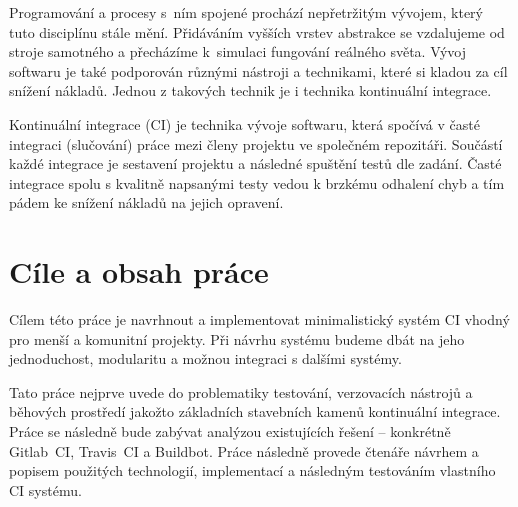 \begin{introduction}

Programování a procesy s~ním spojené prochází nepřetržitým vývojem, který tuto disciplínu stále mění. 
Přidáváním vyšších vrstev abstrakce se vzdalujeme od stroje samotného a přecházíme k~simulaci fungování reálného světa.
Vývoj softwaru je také podporován různými nástroji a technikami, které si kladou za cíl snížení nákladů.
Jednou z takových technik je i technika kontinuální integrace.

Kontinuální integrace (CI) je technika vývoje softwaru, která spočívá v časté integraci (slučování) práce mezi členy projektu ve společném repozitáři.
Součástí každé integrace je sestavení projektu a následné spuštění testů dle zadání.
Časté integrace spolu s kvalitně napsanými testy vedou k brzkému odhalení chyb a tím pádem ke snížení nákladů na jejich opravení.
\cite{fowler_ci}

\section{Cíle a obsah práce}

Cílem této práce je navrhnout a implementovat minimalistický systém CI vhodný pro menší a komunitní projekty.
Při návrhu systému budeme dbát na jeho jednoduchost, modularitu a možnou integraci s dalšími systémy.

Tato práce nejprve uvede do problematiky testování, verzovacích nástrojů a běhových prostředí jakožto základních stavebních kamenů kontinuální integrace.
Práce se následně bude zabývat analýzou existujících řešení -- konkrétně Gitlab~CI, Travis~CI a Buildbot.
Práce následně provede čtenáře návrhem a popisem použitých technologií, implementací a následným testováním vlastního CI systému.

\end{introduction}
